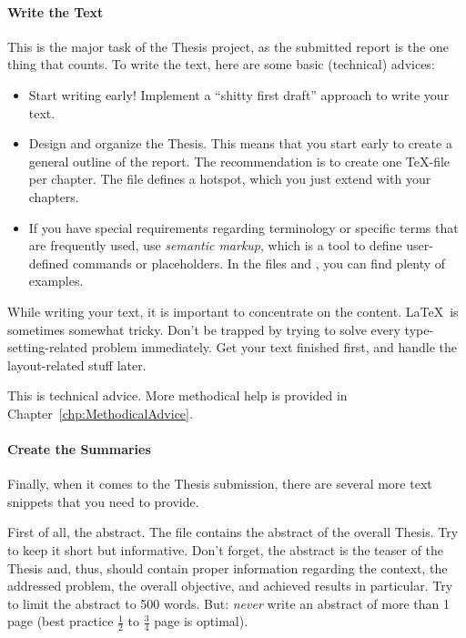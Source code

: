 \paragraph{Write the Text}
This is the major task of the Thesis project, as the submitted report is the one thing that counts. To write the text, here are some basic (technical) advices:
\begin{itemize}
	\item Start writing early! Implement a ``shitty first draft'' approach to write your text.
	\item Design and organize the Thesis. This means that you start early to create a general outline of the report. The recommendation is to create one \TeX-file per chapter. The file  defines a hotspot, which you just extend with your chapters.
	\item If you have special requirements regarding terminology or specific terms that are frequently used, use \emph{semantic markup}, which is a tool to define user-defined commands or placeholders. In the files  and , you can find plenty of examples.
\end{itemize}
While writing your text, it is important to concentrate on the content. \LaTeX\ is sometimes somewhat tricky. Don't be trapped by trying to solve every type-setting-related problem immediately. Get your text finished first, and handle the layout-related stuff later.

\begin{MySugg}
	This is technical advice. More methodical help is provided in Chapter~\ref{chp:MethodicalAdvice}.
\end{MySugg}


\paragraph{Create the Summaries}
Finally, when it comes to the Thesis submission, there are several more text snippets that you need to provide.

First of all, the abstract. The file  contains the abstract of the overall Thesis. Try to keep it short but informative. Don't forget, the abstract is the teaser of the Thesis and, thus, should contain proper information regarding the context, the addressed problem, the overall objective, and achieved results in particular. Try to limit the abstract to 500 words. But: \emph{never} write an abstract of more than 1 page (best practice $\frac{1}{2}$ to $\frac{3}{4}$ page is optimal).

